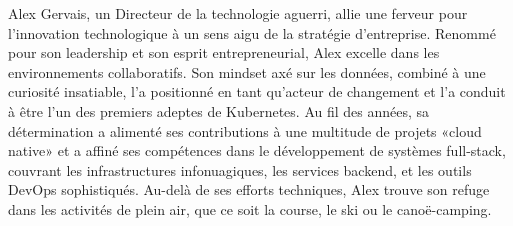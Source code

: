 
\begin{cvparagraph}

Alex Gervais, un Directeur de la technologie aguerri, allie une ferveur pour l'innovation technologique à un sens aigu de la stratégie d'entreprise. Renommé pour son leadership et son esprit entrepreneurial, Alex excelle dans les environnements collaboratifs. Son mindset axé sur les données, combiné à une curiosité insatiable, l'a positionné en tant qu'acteur de changement et l'a conduit à être l'un des premiers adeptes de Kubernetes. Au fil des années, sa détermination a alimenté ses contributions à une multitude de projets «cloud native» et a affiné ses compétences dans le développement de systèmes full-stack, couvrant les infrastructures infonuagiques, les services backend, et les outils DevOps sophistiqués. Au-delà de ses efforts techniques, Alex trouve son refuge dans les activités de plein air, que ce soit la course, le ski ou le canoë-camping.

\end{cvparagraph}